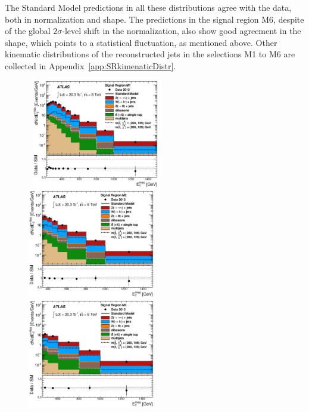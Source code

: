 The Standard Model predictions in all these distributions agree with the data, both in normalization and shape.
The predictions in the signal region M6, despite of the global $2\sigma$-level shift in the normalization, also show good agreement in the shape, which points to a statistical fluctuation, as mentioned above.
Other kinematic distributions of the reconstructed jets in the selections M1 to M6 are collected in Appendix~\ref{app:SRkimenaticDistr}.

\begin{figure}[!ht]
  \begin{center}
    \mbox{
      \includegraphics[width=0.495\textwidth]{MonojetAnalysis/Figures/plot_Stop_A6_SR_met_fitted.eps}
      \includegraphics[width=0.495\textwidth]{MonojetAnalysis/Figures/plot_Stop_A3_SR_met_fitted.eps}
    }
    \mbox{
      \includegraphics[width=0.495\textwidth]{MonojetAnalysis/Figures/plot_Stop_A4_SR_met_fitted.eps}
}
\end{center}
\end{figure}
